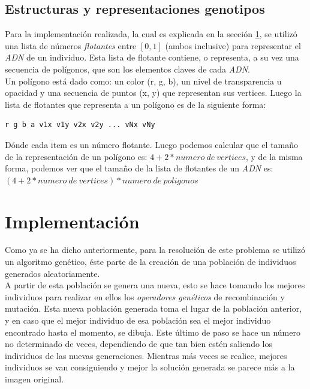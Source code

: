 \documentclass[11pt, spanish]{article}
\begin{document}
\subsection{Estructuras y representaciones genotipos}
Para la implementación realizada, la cual es explicada en la sección
\ref{sec:implementacion}, se utilizó una lista de números
\emph{flotantes} entre $[0, 1]$ (ambos inclusive) para representar el
\emph{ADN} de un individuo. Esta lista de flotante contiene, o
representa, a su vez una secuencia de polígonos, que son los elementos
claves de cada \emph{ADN}.\\

Un polígono está dado como: un color (r, g, b), un nivel de transparencia u
opacidad y una secuencia de puntos (x, y) que representan sus
vertices. Luego la lista de flotantes que representa a un polígono es
de la siguiente forma:

\begin{verbatim}
r g b a v1x v1y v2x v2y ... vNx vNy
\end{verbatim}

Dónde cada item es un número flotante. Luego podemos calcular que el
tamaño de la representación de un polígono es: $4 + 2 * numero\ de\
vertices$, y de la misma forma, podemos ver que el tamaño de la lista
de flotantes de un \emph{ADN} es: $(4 + 2 * numero\ de\ vertices) *
numero\ de\ poligonos$

\section{Implementación}
\label{sec:implementacion}
Como ya se ha dicho anteriormente, para la resolución de este problema
se utilizó un algoritmo genético, éste parte de la creación de una
población de individuos generados aleatoriamente.\\

A partir de esta población se genera una nueva, esto se hace tomando
los mejores individuos para realizar en ellos los \emph{operadores
  genéticos} de recombinación y mutación. Esta nueva población
generada toma el lugar de la población anterior, y en caso que el
mejor individuo de esa población sea el mejor individuo encontrado
hasta el momento, se dibuja. Este último de paso se hace un número no
determinado de veces, dependiendo de que tan bien estén saliendo los
individuos de las nuevas generaciones. Mientras más veces se realice,
mejores individuos se van consiguiendo y mejor la solución generada se
parece más a la imagen original.\\
\end{document}
